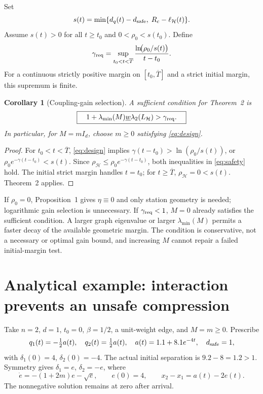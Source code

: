 \documentclass[11pt,a4paper]{article}
\newtheorem{corollary}{Corollary}
\theoremstyle{remark}
\begin{document}
Set
\begin{equation}
s(t)=\min\{d_q(t)-d_{\rm safe},\;R_c-\ell_{\mathcal H}(t)\}.
\label{eq:margin}
\end{equation}
Assume $s(t)>0$ for all $t\ge t_0$ and $0<\rho_0<s(t_0)$. Define
\begin{equation}
\gamma_{\rm req}
=\sup_{t_0<t<\overline T}
\frac{\ln\!\bigl(\rho_0/s(t)\bigr)}{t-t_0}.
\label{eq:req}
\end{equation}
For a continuous strictly positive margin on $[t_0,\overline T]$ and a strict initial margin, this supremum is finite.

\begin{corollary}[Coupling-gain selection]
A sufficient condition for Theorem~2 is
\begin{equation}
\boxed{\quad
1+\lambda_{\min}(M)\underline w\lambda_2(L_{\mathcal H})
>\gamma_{\rm req}.
\quad}
\label{eq:design}
\end{equation}
In particular, for $M=mI_d$, choose $m\ge0$ satisfying \eqref{eq:design}.
\end{corollary}
\begin{proof}
For $t_0<t<\overline T$, \eqref{eq:design} implies
$\gamma(t-t_0)>\ln(\rho_0/s(t))$, or
$\rho_0e^{-\gamma(t-t_0)}<s(t)$.
Since $\rho_{\mathcal H}\le\rho_0e^{-\gamma(t-t_0)}$, both inequalities in \eqref{eq:safety} hold. The initial strict margin handles $t=t_0$; for $t\ge\overline T$, $\rho_{\mathcal H}=0<s(t)$. Theorem~2 applies.
\end{proof}
If $\rho_0=0$, Proposition~1 gives $\eta\equiv0$ and only station geometry is needed; logarithmic gain selection is unnecessary. If $\gamma_{\rm req}<1$, $M=0$ already satisfies the sufficient condition. A larger graph eigenvalue or larger $\lambda_{\min}(M)$ permits a faster decay of the available geometric margin. The condition is conservative, not a necessary or optimal gain bound, and increasing $M$ cannot repair a failed initial-margin test.

\newpage
\section{Analytical example: interaction prevents an unsafe compression}

Take $n=2$, $d=1$, $t_0=0$, $\beta=1/2$, a unit-weight edge, and $M=m\ge0$. Prescribe
\begin{equation}
q_1(t)=-\tfrac12a(t),\quad q_2(t)=\tfrac12a(t),\quad
a(t)=1.1+8.1e^{-4t},\quad d_{\rm safe}=1,
\label{eq:example-stations}
\end{equation}
with $\delta_1(0)=4$, $\delta_2(0)=-4$. The actual initial separation is $9.2-8=1.2>1$. Symmetry gives $\delta_1=e$, $\delta_2=-e$, where
\begin{equation}
\dot e=-(1+2m)e-\sqrt e,\qquad e(0)=4,
\qquad x_2-x_1=a(t)-2e(t).
\label{eq:example-error}
\end{equation}
The nonnegative solution remains at zero after arrival.
\end{document}
